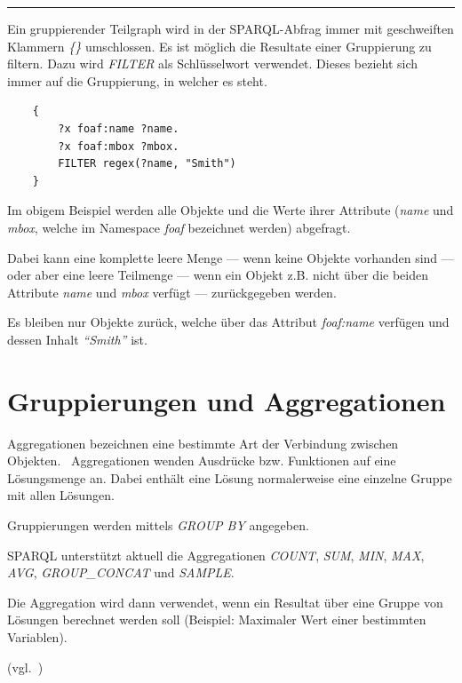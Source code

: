 \noindent\rule[1ex]{\textwidth}{1pt}

Ein gruppierender Teilgraph wird in der SPARQL-Abfrag immer mit geschweiften Klammern \textit{\{\}} umschlossen. Es ist möglich die Resultate einer Gruppierung zu filtern. Dazu wird \textit{FILTER} als Schlüsselwort verwendet. Dieses bezieht sich immer auf die Gruppierung, in welcher es steht.

\begin{lstlisting}
    {
        ?x foaf:name ?name.
        ?x foaf:mbox ?mbox.
        FILTER regex(?name, "Smith")
    }
\end{lstlisting}

Im obigem Beispiel werden alle Objekte und die Werte ihrer Attribute (\textit{name} und \textit{mbox}, welche im Namespace \textit{foaf} bezeichnet werden) abgefragt.

Dabei kann eine komplette leere Menge --- wenn keine Objekte vorhanden sind --- oder aber eine leere Teilmenge --- wenn ein Objekt z.B. nicht über die beiden Attribute \textit{name} und \textit{mbox} verfügt --- zurückgegeben werden.

Es bleiben nur Objekte zurück, welche über das Attribut \textit{foaf:name} verfügen und dessen Inhalt \textit{``Smith''} ist.

\section{Gruppierungen und Aggregationen}
\label{sec:sparql_gruppierungenaggregationen}
Aggregationen bezeichnen eine bestimmte Art der Verbindung zwischen Objekten.~\cite{wiki:aggregation} Aggregationen wenden Ausdrücke bzw. Funktionen auf eine Lösungsmenge an. Dabei enthält eine Lösung normalerweise eine einzelne Gruppe mit allen Lösungen.

Gruppierungen werden mittels \textit{GROUP BY} angegeben.

SPARQL unterstützt aktuell die Aggregationen \textit{COUNT}, \textit{SUM}, \textit{MIN}, \textit{MAX}, \textit{AVG}, \textit{GROUP\_CONCAT} und \textit{SAMPLE}.

Die Aggregation wird dann verwendet, wenn ein Resultat über eine Gruppe von Lösungen berechnet werden soll (Beispiel: Maximaler Wert einer bestimmten Variablen).

(vgl.~\cite[11 Aggregates]{w3sparql_querylang})

